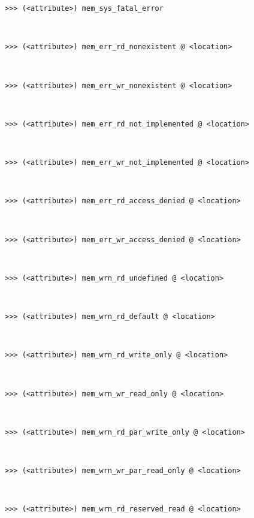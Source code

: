 \begin{description}
                \begin{description}
                    \item[\texttt{>{}>{}> (<attribute>) mem\_sys\_fatal\_error}]~\\
                    \item[\texttt{>{}>{}> (<attribute>) mem\_err\_rd\_nonexistent @ <location>}]~\\
                    \item[\texttt{>{}>{}> (<attribute>) mem\_err\_wr\_nonexistent @ <location>}]~\\
                    \item[\texttt{>{}>{}> (<attribute>) mem\_err\_rd\_not\_implemented @ <location>}]~\\
                    \item[\texttt{>{}>{}> (<attribute>) mem\_err\_wr\_not\_implemented @ <location>}]~\\
                    \item[\texttt{>{}>{}> (<attribute>) mem\_err\_rd\_access\_denied @ <location>}]~\\
                    \item[\texttt{>{}>{}> (<attribute>) mem\_err\_wr\_access\_denied @ <location>}]~\\
                    \item[\texttt{>{}>{}> (<attribute>) mem\_wrn\_rd\_undefined @ <location>}]~\\
                    \item[\texttt{>{}>{}> (<attribute>) mem\_wrn\_rd\_default @ <location>}]~\\
                    \item[\texttt{>{}>{}> (<attribute>) mem\_wrn\_rd\_write\_only @ <location>}]~\\
                    \item[\texttt{>{}>{}> (<attribute>) mem\_wrn\_wr\_read\_only @ <location>}]~\\
                    \item[\texttt{>{}>{}> (<attribute>) mem\_wrn\_rd\_par\_write\_only @ <location>}]~\\
                    \item[\texttt{>{}>{}> (<attribute>) mem\_wrn\_wr\_par\_read\_only @ <location>}]~\\
                    \item[\texttt{>{}>{}> (<attribute>) mem\_wrn\_rd\_reserved\_read @ <location>}]~\\

\end{description}
\end{description}
